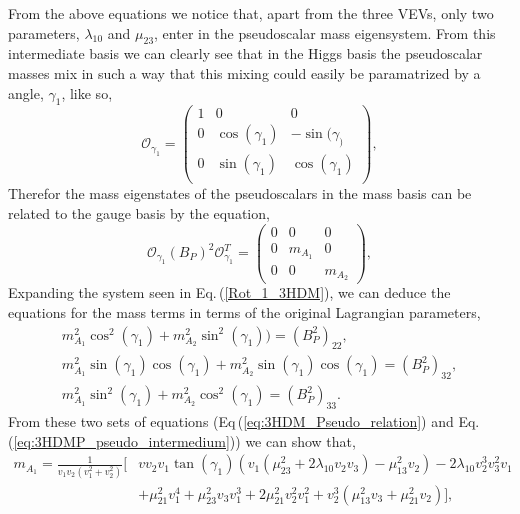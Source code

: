 \documentclass[10pt]{book}
\renewcommand{\(}{\left(}
\renewcommand{\)}{\right)}
\renewcommand{\[}{\left[}
\renewcommand{\]}{\right]}
\begin{document}
%
From the above equations we notice that, apart from the three VEVs, only two parameters, $\lambda_{10}$ and $\mu_{23}$, enter in the pseudoscalar mass eigensystem. 
%
From this intermediate basis we can clearly see that in the Higgs basis the pseudoscalar masses mix in such a way that this mixing could easily be paramatrized by a angle, $\gamma_1$, like so,
%
%
\begin{equation}
\mathcal{O}_{\gamma_1} = \begin{pmatrix}
1 & 0 & 0 \\
0 & \cos(\gamma_1) & -\sin(\gamma_) \\ 
0 & \sin(\gamma_1) & \cos(\gamma_1) \\
\end{pmatrix} ,
\end{equation}
Therefor the mass eigenstates of the pseudoscalars in the mass basis can be related to the gauge basis by the equation,
\begin{equation}
\label{Rot_1_3HDM}
\mathcal{O}_{\gamma_1} \left( B_P \right)^2 \mathcal{O}_{\gamma_1}^T   = \begin{pmatrix}
0 & 0 & 0 \\ 
0 & m_{A_1} & 0 \\ 
0 & 0 & m_{A_2}
\end{pmatrix} ,
\end{equation}
Expanding the system seen in Eq.\,(\ref{Rot_1_3HDM}), we can deduce the equations for the mass terms in terms of the original Lagrangian parameters, 
\begin{equation}
\label{eq:3HDM_Pseudo_relation}
\begin{gathered}
m_{A_1}^2 \cos ^2\left(\gamma _1\right)+m_{A_2}^2 \sin ^2\left(\gamma _1\right)) = \left( B^2_P \right)_{22}, \\
m_{A_1}^2 \sin \left(\gamma _1\right) \cos \left(\gamma _1\right)+m_{A_2}^2 \sin \left(\gamma _1\right) \cos \left(\gamma _1\right) = \left( B^2_P \right)_{32}, \\ 
m_{A_1}^2 \sin ^2\left(\gamma _1\right)+m_{A_2}^2 \cos ^2\left(\gamma _1\right) = \left( B^2_P \right)_{33}. 
\end{gathered}
\end{equation}
From these two sets of equations (Eq\,(\ref{eq:3HDM_Pseudo_relation}) and Eq.\,(\ref{eq:3HDMP_pseudo_intermedium})) we can show that, %
\begin{equation}
\begin{split}
m_{A_1} = \frac{1}{v_1 v_2 \left(v_1^2+v_2^2\right)} \Bigg[ & v v_2 v_1 \tan \left(\gamma _1\right) \left(v_1 \left(\mu _{23}^2+2 \lambda _{10} v_2 v_3\right)-\mu_{13}^2 v_2\right)-2 \lambda _{10} v_2^3 v_3^2 v_1 \\ &  + \mu _{21}^2 v_1^4+\mu _{23}^2 v_3 v_1^3+2 \mu_{21}^2 v_2^2 v_1^2+v_2^3 \left(\mu _{13}^2 v_3+\mu _{21}^2 v_2\right) \Bigg],  \\ 
\end{split}
\end{equation}
\end{document}
